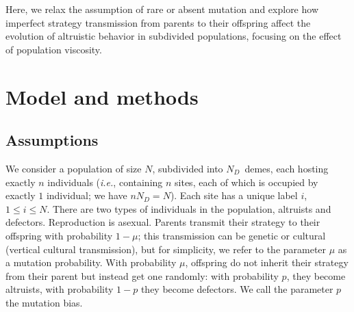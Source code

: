 \documentclass[11pt, letterpaper]{article}
\newcommand{\ie}{\textit{i.\!e.\!}}
\newcommand{\ndemes}{N_D}
\begin{document}
Here, we relax the assumption of rare or absent mutation and explore how imperfect strategy transmission from parents to their offspring affect the evolution of altruistic behavior in subdivided populations, focusing on the effect of population viscosity. 


\section{Model and methods}

\subsection{Assumptions}

We consider a population of size $N$, subdivided into $\ndemes$~demes, each hosting exactly $n$ individuals (\ie, containing $n$ sites, each of which is occupied by exactly $1$ individual; we have $n \ndemes = N$). Each site has a unique label $i$, $1\leq i \leq N$. There are two types of individuals in the population, altruists and defectors. Reproduction is asexual. Parents transmit their strategy to their offspring with probability $1-\mu$; this transmission can be genetic or cultural (vertical cultural transmission), but for simplicity, we refer to the parameter $\mu$ as a mutation probability. With probability $\mu$, offspring do not inherit their strategy from their parent but instead get one randomly: with probability $p$, they become altruists, with probability $1-p$ they become defectors. We call the parameter $p$ the mutation bias. 
\end{document}
